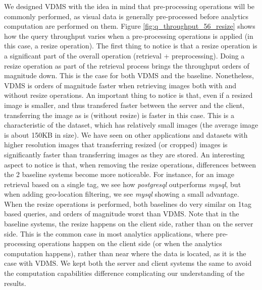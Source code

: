 We designed VDMS with the idea in mind that pre-processing operations will be
commonly performed, as visual data is generally pre-processed before analytics
computation are performed on them.
Figure \ref{fig:q_throughput_56_resize} shows how the query throughput varies
when a pre-processing operations is applied (in this case, a resize operation).
The first thing to notice is that a resize operation is a significant part of
the overall operation (retrieval + preprocessing).
Doing a resize operation as part of the retrieval process
brings the throughput orders of magnitude down.
This is the case for both VDMS and the baseline.
Nonetheless, VDMS is orders of magnitude faster when retrieving images
both with and without resize operations.
An important thing to notice is that, even if a resized image is smaller,
and thus transfered faster between the server and the client,
transferring the image as is (without resize) is faster in this case.
This is a characteristic of the dataset, which has relatively small images
(the average image is about 150KB in size).
We have seen on other applications and datasets with higher resolution images
that transferring resized (or cropped) images is significantly faster than
transferring images as they are stored.
An interesting aspect to notice is that, when removing the resize operations,
differences between the 2 baseline systems become more noticeable.
For instance, for an image retrieval based on a single tag, we see how
\textit{postgresql} outperforms \textit{mysql}, but when adding geo-location
filtering, we see \textit{mysql} showing a small advantage.
When the resize operations is performed, both baselines do very similar
on 1tag based queries, and orders of magnitude worst than VDMS.
Note that in the baseline systems, the resize happens on the client side,
rather than on the server side.
This is the common case in most analytics applications, where pre-processing
operations happen on the client side (or when the analytics computation happens),
rather than near where the data is located, as it is the case with VDMS.
We kept both the server and client systems the same to avoid the computation
capabilities difference complicating our understanding of the results.





